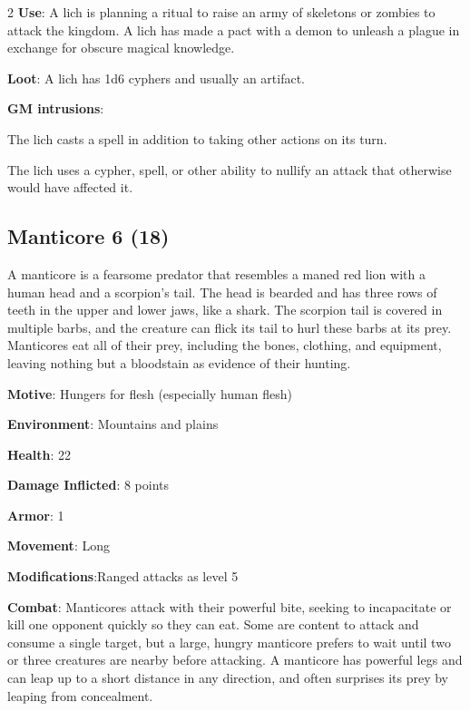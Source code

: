 \begin{multicols}{2}
\textbf{Use}: A lich is planning a ritual to raise an army of skeletons or zombies to attack the kingdom. A lich has made a pact with a demon to unleash a plague in exchange for obscure magical knowledge. 

\textbf{Loot}: A lich has 1d6 cyphers and usually an artifact.

\textbf{GM intrusions}: 

The lich casts a spell in addition to taking other actions on its turn. 

The lich uses a cypher, spell, or other ability to nullify an attack that otherwise would have affected it.

\subsection{Manticore 6 (18)}

A manticore is a fearsome predator that resembles a maned red lion with a human head and a scorpion’s tail. The head is bearded and has three rows of teeth in the upper and lower jaws, like a shark. The scorpion tail is covered in multiple barbs, and the creature can flick its tail to hurl these barbs at its prey. Manticores eat all of their prey, including the bones, clothing, and equipment, leaving nothing but a bloodstain as evidence of their hunting. 

\textbf{Motive}: Hungers for flesh (especially human flesh) 

\textbf{Environment}: Mountains and plains 

\textbf{Health}: 22 

\textbf{Damage Inflicted}: 8 points 

\textbf{Armor}: 1 

\textbf{Movement}: Long 

\textbf{Modifications}:Ranged attacks as level 5 

\textbf{Combat}: Manticores attack with their powerful bite, seeking to incapacitate or kill one opponent quickly so they can eat. Some are content to attack and consume a single target, but a large, hungry manticore prefers to wait until two or three creatures are nearby before attacking. A manticore has powerful legs and can leap up to a short distance in any direction, and often surprises its prey by leaping from concealment. 


\end{multicols}
